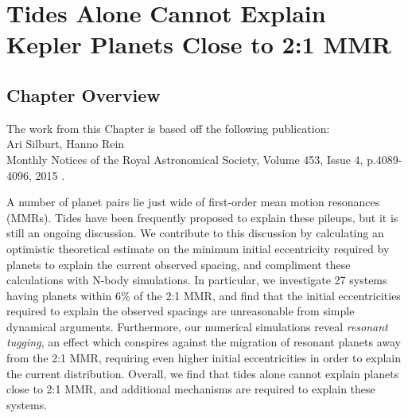 \chapter[Tides Can't Explain Planets Close to MMR]{Tides Alone Cannot Explain Kepler Planets Close to 2:1 MMR}
\label{chap:Tides}

\section{Chapter Overview}
	\begin{center}
	\begin{minipage}[c]{4.75in}
	The work from this Chapter is based off the following publication:\\
	
	Ari Silburt, Hanno Rein\\
	Monthly Notices of the Royal Astronomical Society, Volume 453, Issue 4, p.4089-4096, 2015 \citep{Silburt2015b}.
	\vspace{2em}
	\end{minipage}
	\end{center}

A number of \kep planet pairs lie just wide of first-order mean motion resonances (MMRs).
Tides have been frequently proposed to explain these pileups, but it is still an ongoing discussion.  
We contribute to this discussion by calculating an optimistic theoretical estimate on the minimum initial eccentricity required by \kep planets to explain the current observed spacing, and compliment these calculations with N-body simulations.
In particular, we investigate 27 \kep systems having planets within $6\%$ of the 2:1 MMR, and find that the initial eccentricities required to explain the observed spacings are unreasonable from simple dynamical arguments.
Furthermore, our numerical simulations reveal \textit{resonant tugging}, an effect which conspires against the migration of resonant planets away from the 2:1 MMR, requiring even higher initial eccentricities in order to explain the current \kep distribution. 
Overall, we find that tides alone cannot explain planets close to 2:1 MMR, and additional mechanisms are required to explain these systems. 

